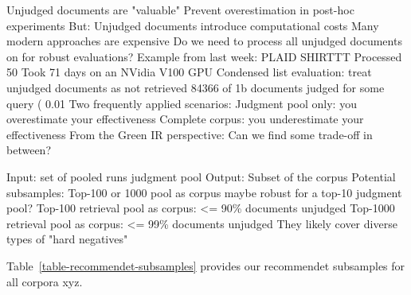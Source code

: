 Unjudged documents are "valuable"
Prevent overestimation in post-hoc experiments
But: Unjudged documents introduce computational costs
Many modern approaches are expensive
Do we need to process all unjudged documents on for robust evaluations?
Example from last week: PLAID SHIRTTT
Processed 50%
Took 71 days on an NVidia V100 GPU
Condensed list evaluation: treat unjudged documents as not retrieved
84366 of 1b documents judged for some query ( 0.01%
Two frequently applied scenarios:
Judgment pool only: you overestimate your effectiveness
Complete corpus: you underestimate your effectiveness
From the Green IR perspective: Can we find some trade-off in between?


Input:
set of pooled runs
judgment pool
Output:
Subset of the corpus
Potential subsamples:
Top-100 or 1000 pool as corpus maybe robust for a top-10 judgment pool?
Top-100 retrieval pool as corpus: <= 90\% documents unjudged
Top-1000 retrieval pool as corpus: <= 99\% documents unjudged
They likely cover diverse types of "hard negatives"



Table~\ref{table-recommendet-subsamples} provides our recommendet subsamples for all corpora xyz.
